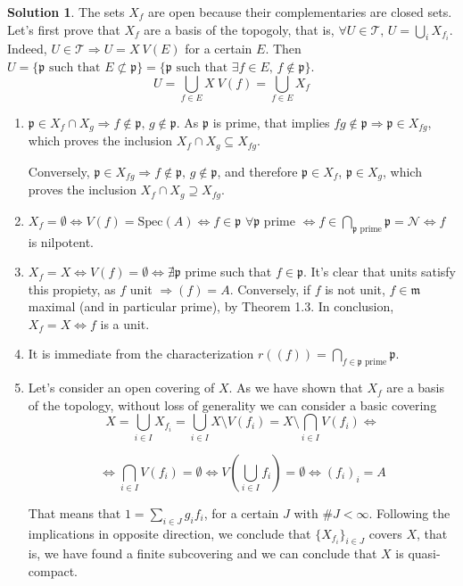 \documentclass[12pt]{article}
\newcommand{\imp}{\ensuremath{\Rightarrow}}
\newcommand{\ip}{\ensuremath{\mathfrak{p}}}
\newcommand{\im}{\ensuremath{\mathfrak{m}}}
\theoremstyle{definition}
\newtheorem*{sol}{Solution}
\begin{document}
\begin{sol}
	The sets $X_f$ are open because their complementaries are closed sets. Let's first prove that $X_f$ are a basis of the topogoly, that is, $\forall U \in \mathcal{T}, \, U = \bigcup_i X_{f_i}$. Indeed, $U \in \mathcal{T} \imp U = X \ V(E)$ for a certain $E$. Then $U = \{ \ip \text{ such that } E \not \subset \ip \} = \{\ip \text{ such that } \exists f \in E, \, f \notin \ip \}$.
	\[
		U = \bigcup_{f \in E} X \ V(f) = \bigcup_{f \in E} X_f
	\]

	\begin{enumerate}[label=(\roman*)]
		\item $\ip \in X_f \cap X_g \imp f \notin \ip, \, g \notin \ip$. As $\ip$ is prime, that implies $fg \notin \ip \imp \ip \in X_{fg}$, which proves the inclusion $X_f \cap X_g \subseteq X_{fg}$.

		Conversely, $\ip \in X_{fg} \imp f \notin \ip, \, g \notin \ip$, and therefore $\ip \in X_f$, $\ip \in X_g$, which proves the inclusion $X_f \cap X_g \supseteq X_{fg}$.

		\item $X_f = \emptyset \iff V(f) = \text{Spec}(A) \iff f \in \ip \, \, \forall \ip$ prime $\iff f \in \bigcap_{\ip \text{ prime}} \ip = \mathcal{N} \iff f$ is nilpotent.

		\item $X_f = X \iff V(f) = \emptyset \iff \nexists \ip$ prime such that $f \in \ip$. It's clear that units satisfy this propiety, as $f$ unit $\imp (f) = A$. Conversely, if $f$ is not unit, $f \in \im$ maximal (and in particular prime), by Theorem 1.3. In conclusion, $X_f = X \iff f$ is a unit.

		\item It is immediate from the characterization $r((f)) = \bigcap_{f \in \ip \text{ prime}} \ip$. 

		\item Let's consider an open covering of $X$. As we have shown that $X_f$ are a basis of the topology, without loss of generality we can consider a basic covering
		\[
			X = \bigcup_{i \in I} X_{f_i} =  \bigcup_{i \in I} X \setminus V(f_i) = X \setminus \bigcap_{i \in I} V(f_i) \iff
		\]

		\[
			\iff \bigcap_{i \in I} V(f_i) = \emptyset \iff V(\bigcup_{i \in I} f_i) = \emptyset \iff (f_i)_i = A
		\]

		That means that $1 = \sum_{i \in J} g_i f_i$, for a certain $J$ with $\#J < \infty$. Following the implications in opposite direction, we conclude that $\{ X_{f_i} \}_{i \in J}$ covers $X$, that is, we have found a finite subcovering and we can conclude that $X$ is quasi-compact.


\end{enumerate}
\end{sol}
\end{document}
